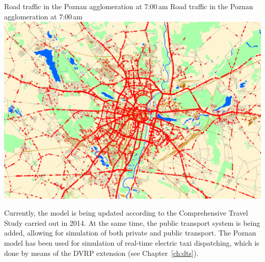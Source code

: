 \createfigure%
{Road traffic in the Poznan agglomeration at 7:00\,am}%
{Road traffic in the Poznan agglomeration at 7:00\,am}%
{\label{fig:poznan_traffic_simulation}}%
{\includegraphics[width=\textwidth, angle=0]{using/figures/poznan_traffic_simulation}}%
{}%

Currently, the model is being updated according to the Comprehensive Travel Study carried out in 2014. At the same time, the public transport system is being added, allowing for simulation of both private and public transport. The Poznan model has been used for simulation of real-time electric taxi dispatching, which is done by means of the DVRP extension (see Chapter~\ref{ch:dts}).

